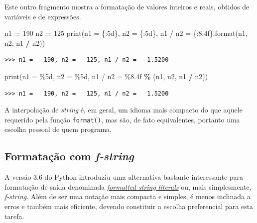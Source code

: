 \documentclass[
]{book}
\newenvironment{Shaded}{\begin{snugshade}}{\end{snugshade}}
\newcommand{\BuiltInTok}[1]{#1}
\newcommand{\DecValTok}[1]{\textcolor[rgb]{0.00,0.00,0.81}{#1}}
\newcommand{\NormalTok}[1]{#1}
\newcommand{\OperatorTok}[1]{\textcolor[rgb]{0.81,0.36,0.00}{\textbf{#1}}}
\newcommand{\SpecialCharTok}[1]{\textcolor[rgb]{0.00,0.00,0.00}{#1}}
\newcommand{\StringTok}[1]{\textcolor[rgb]{0.31,0.60,0.02}{#1}}
\begin{document}
Este outro fragmento mostra a formatação de valores inteiros e reais, obtidos de variáveis e de expressões.

\begin{Shaded}
\begin{Highlighting}[]
\NormalTok{n1 }\OperatorTok{=} \DecValTok{190}
\NormalTok{n2 }\OperatorTok{=} \DecValTok{125}
\BuiltInTok{print}\NormalTok{(}\StringTok{\textquotesingle{}n1 = }\SpecialCharTok{\{:5d\}}\StringTok{, n2 = }\SpecialCharTok{\{:5d\}}\StringTok{, n1 / n2 = }\SpecialCharTok{\{:8.4f\}}\StringTok{\textquotesingle{}}\NormalTok{.}\BuiltInTok{format}\NormalTok{(n1, n2, n1 }\OperatorTok{/}\NormalTok{ n2))}
\end{Highlighting}
\end{Shaded}

\begin{verbatim}
>>> n1 =   190, n2 =   125, n1 / n2 =   1.5200
\end{verbatim}

\begin{Shaded}
\begin{Highlighting}[]
\BuiltInTok{print}\NormalTok{(}\StringTok{\textquotesingle{}n1 = }\SpecialCharTok{\%5d}\StringTok{, n2 = }\SpecialCharTok{\%5d}\StringTok{, n1 / n2 = }\SpecialCharTok{\%8.4f}\StringTok{\textquotesingle{}} \OperatorTok{\%}\NormalTok{ (n1, n2, n1 }\OperatorTok{/}\NormalTok{ n2))}
\end{Highlighting}
\end{Shaded}

\begin{verbatim}
>>> n1 =   190, n2 =   125, n1 / n2 =   1.5200
\end{verbatim}

A interpolação de \emph{string} é, em geral, um idioma mais compacto do que aquele requerido pela função \texttt{format()}, mas são, de fato equivalentes, portanto uma escolha pessoal de quem programa.

\hypertarget{e-s-format-fstring}{%
\subsection{\texorpdfstring{Formatação com \emph{f-string}}{Formatação com f-string}}\label{e-s-format-fstring}}

A versáo 3.6 do Python introduziu uma alternativa bastante interessante para formatação de saída denominada \href{https://docs.python.org/3/tutorial/inputoutput.html\#formatted-string-literals}{\emph{formatted string literals}} ou, mais simplesmente, \emph{f-string}. Além de ser uma notação mais compacta e simples, é menos inclinada a erros e também mais eficiente, devendo constituir a escolha preferencial para esta tarefa.
\end{document}
